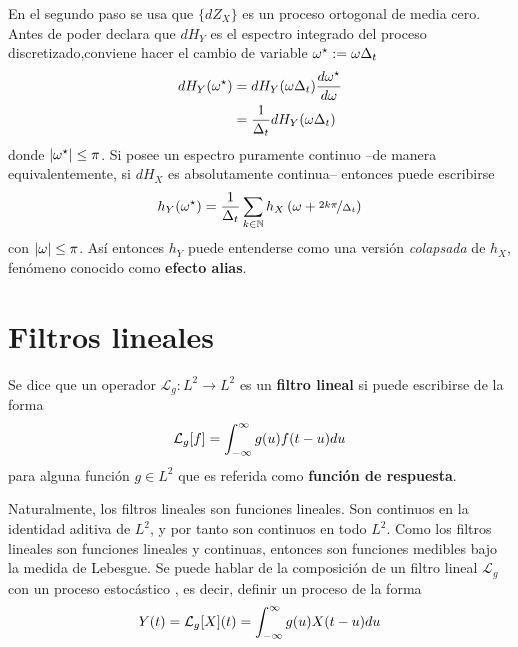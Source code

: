 En el segundo paso se usa que $\{ dZ_X \}$ es un proceso ortogonal de media cero. Antes de poder declara que $dH_Y$ es el espectro integrado del proceso discretizado,conviene hacer el cambio de variable $\omega^{\star} := \omega \Delta_t$
\begin{align*}
dH_Y(\omega^{\star}) &= dH_Y(\omega \Delta_t) \frac{d\omega^{\star}}{d\omega} \\
&= \frac{1}{\Delta_t} dH_Y(\omega \Delta_t)
\end{align*}
donde $\left| \omega^{\star} \right| \leq \pi$.
%
Si \xt posee un espectro puramente continuo --de manera equivalentemente, si $dH_X$ es absolutamente continua-- entonces puede escribirse
\begin{equation}
h_Y(\omega^{\star}) = \frac{1}{\Delta_t} \sum_{k \in \mathbb{N}} h_X\left( \omega + \nicefrac{2 k \pi}{\Delta_t}\right)
\end{equation}
con $\left| \omega \right| \leq \pi$. 
%
Así entonces $h_Y$ puede entenderse como una versión \textit{colapsada} de $h_X$, fenómeno conocido como \textbf{efecto alias}.


\section{Filtros lineales}

\begin{definicion}
Se dice que un operador $\mathcal{L}_g : L^{2} \rightarrow L^{2}$ es un \textbf{filtro lineal} si puede escribirse de la forma
\begin{equation}
\mathcal{L}_g[f] = \int_{-\infty}^{\infty} g(u) f(t-u) du
\end{equation}
para alguna función $g\in L^{2}$ que es referida como \textbf{función de respuesta}.
\end{definicion}

Naturalmente, los filtros lineales son funciones lineales. 
%
Son continuos en la identidad aditiva de $L^{2}$, y por tanto son continuos en todo $L^{2}$. 
%
Como los filtros lineales son funciones lineales y continuas, entonces son funciones medibles bajo la medida de Lebesgue. 
%
Se puede hablar de la composición de un filtro lineal $\mathcal{L}_g$ con un proceso estocástico \xt, es decir, definir un proceso de la forma
\begin{equation}
Y(t) = \mathcal{L}_g[X](t) =  \int_{-\infty}^{\infty} g(u) X(t-u) du
\label{eq:filtrado}
\end{equation}

